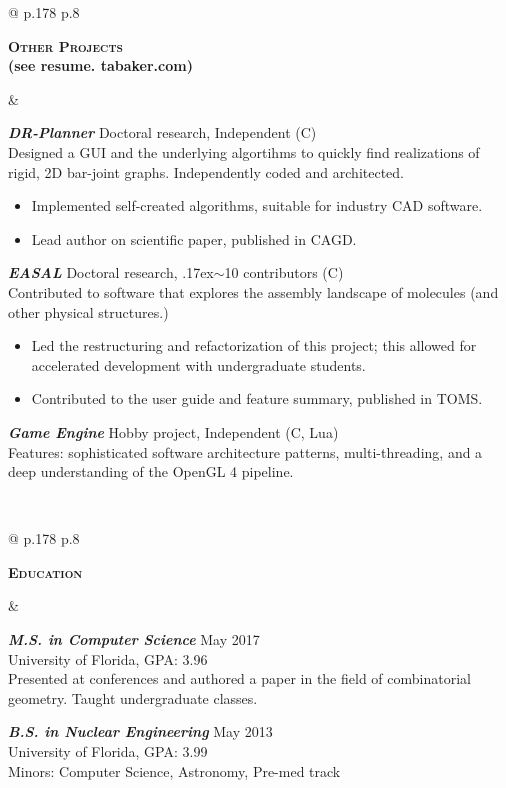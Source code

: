 \documentclass[10pt]{article}
\def\mytilde{{\raise.17ex\hbox{$\scriptstyle\mathtt{\sim}$}}}
\def\cpp{{C\nolinebreak[4]\hspace{-.05em}\raisebox{.4ex}{\tiny\bf ++}}}
\newcommand{\titlecell}[1]{%
  \begin{minipage}[t]{\linewidth}
    \raggedleft \textbf{#1}
\end{minipage}}
\newcommand{\contentcell}[1]{%
  \begin{minipage}[t]{\linewidth}
    #1
\end{minipage}}
\newcommand{\tablerowskip}{\vspace{1mm} \\}
\newcommand{\degreeskip}{\vspace{2mm}}
\newcommand{\projectskip}{\vspace{3mm}}
\newcommand{\contentcellheader}[1]{\textbf{\textsl{#1}}}
\begin{document}
        \noindent
        \begin{tabular}{@{} p{.178\textwidth} p{.8\textwidth}}
          \titlecell{\textsc{Other Projects} \\ {\small (see resume. tabaker.com)}} &
          \contentcell{
            \contentcellheader{DR-Planner} \hfill Doctoral research, Independent (\cpp)
            \\ Designed a GUI and the underlying algortihms to quickly find realizations of rigid, 2D bar-joint graphs. Independently coded and architected.
            \begin{itemize}[itemsep=0pt,topsep=0pt,leftmargin=*] \itemsep -2pt
            \item Implemented self-created algorithms, suitable for industry CAD software.
            \item Lead author on scientific paper, published in CAGD.
            \end{itemize}
            \projectskip

            \contentcellheader{EASAL} \hfill Doctoral research, \mytilde 10 contributors (\cpp)
            \\ Contributed to software that explores the assembly landscape of molecules (and other physical structures.)
            \begin{itemize}[itemsep=0pt,topsep=0pt,leftmargin=*] \itemsep -2pt
            \item Led the restructuring and refactorization of this project; this allowed for accelerated development with undergraduate students.
            \item Contributed to the user guide and feature summary, published in TOMS.
            \end{itemize}
            \projectskip

            \contentcellheader{Game Engine} \hfill Hobby project, Independent (\cpp, Lua)
            \\ Features: sophisticated software architecture patterns, multi-threading, and a deep understanding of the OpenGL 4
            pipeline.
          }
        \end{tabular}
        \tablerowskip

        \noindent
        \begin{tabular}{@{} p{.178\textwidth} p{.8\textwidth}}
          \titlecell{\textsc{Education}} &
          \contentcell{
            \contentcellheader{M.S. in Computer Science} \hfill May 2017 \\
            University of Florida, GPA: 3.96 \\
            Presented at conferences and authored a paper in the field of combinatorial geometry. Taught undergraduate classes.
            \degreeskip

            \contentcellheader{B.S. in Nuclear Engineering} \hfill May 2013 \\
            University of Florida, GPA: 3.99 \\
            Minors: Computer Science, Astronomy, Pre-med track
          }
        \end{tabular}
        \tablerowskip
\end{document}
